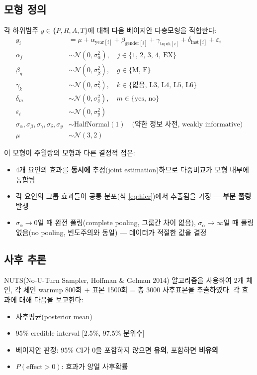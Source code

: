 \documentclass[11pt]{article}
\begin{document}
\subsection{모형 정의}
각 하위범주 $y \in \{P,R,A,T\}$에 대해 다음 베이지안 다층모형을 적합한다:
\begin{align}
y_i &= \mu + \alpha_{\text{year}[i]} + \beta_{\text{gender}[i]} + \gamma_{\text{topik}[i]} + \delta_{\text{inst}[i]} + \varepsilon_i \\
\alpha_j &\sim \mathcal{N}(0, \sigma_\alpha^2), \quad j \in \{\text{1, 2, 3, 4, EX}\} \\
\beta_g  &\sim \mathcal{N}(0, \sigma_\beta^2), \quad g \in \{\text{M, F}\} \\
\gamma_k &\sim \mathcal{N}(0, \sigma_\gamma^2), \quad k \in \{\text{없음, L3, L4, L5, L6}\} \\
\delta_m &\sim \mathcal{N}(0, \sigma_\delta^2), \quad m \in \{\text{yes, no}\} \\
\varepsilon_i &\sim \mathcal{N}(0, \sigma_y^2) \\
\sigma_\alpha,\sigma_\beta,\sigma_\gamma,\sigma_\delta,\sigma_y &\sim \mathrm{HalfNormal}(1) \quad \text{(약한 정보 사전, weakly informative)} \\
\mu &\sim \mathcal{N}(3, 2)
\end{align}

이 모형이 주월랑의 모형과 다른 결정적 점은:
\begin{itemize}
\item 4개 요인의 효과를 \textbf{동시에} 추정(joint estimation)하므로 다중비교가 모형 내부에 통합됨
\item 각 요인의 그룹 효과들이 공통 분포(식 \ref{eq:hier})에서 추출됨을 가정 — \textbf{부분 풀링} 발생
\item $\sigma_\alpha \to 0$일 때 완전 풀링(complete pooling, 그룹간 차이 없음), $\sigma_\alpha \to \infty$일 때 풀링 없음(no pooling, 빈도주의와 동일) — 데이터가 적절한 값을 결정
\end{itemize}

\subsection{사후 추론}
NUTS(No-U-Turn Sampler, Hoffman \& Gelman 2014) 알고리즘을 사용하여 2개 체인, 각 체인 warmup 800회 + 표본 1500회 = 총 3000 사후표본을 추출하였다. 각 효과에 대해 다음을 보고한다:
\begin{itemize}
\item 사후평균(posterior mean)
\item 95\% credible interval [2.5\%, 97.5\% 분위수]
\item 베이지안 판정: 95\% CI가 0을 포함하지 않으면 \textbf{유의}, 포함하면 \textbf{비유의}
\item $P(\text{effect} > 0)$: 효과가 양일 사후확률
\end{itemize}
\end{document}
